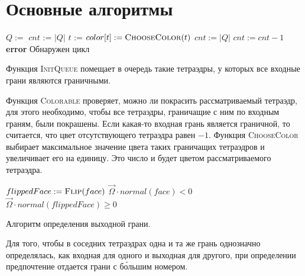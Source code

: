 \chapter{Основные алгоритмы}

\begin{algorithm}[ht!]
\centering
\begin{algorithmic}[1]
\State $Q := $ 
\State $cnt$ := $|Q|$
\State $t$ := 
\State $color[t] := \Call{ChooseColor}{t}$
\State {}
\EndFor
\State $cnt := |Q|$
\Else
\State {}
\State $cnt := cnt - 1$
\EndIf
{}
\State \textbf{error} Обнаружен цикл
\EndIf
\EndWhile
\EndFunction
\end{algorithmic}
\caption{}
\label{alg:1}
\end{algorithm}

Функция \textsc{InitQueue} помещает в очередь такие тетраэдры, у которых все входные грани являются граничными.

Функция \textsc{Colorable} проверяет, можно ли покрасить рассматриваемый тетраэдр, для этого необходимо, чтобы все тетраэдры, граничащие с ним по входным граням, были покрашены. Если какая-то входная грань является граничной, то считается, что цвет отсутствующего тетраэдра равен $-1$. Функция \textsc{ChooseColor} выбирает максимальное значение цвета таких граничащих тетраэдров и увеличивает его на единицу. Это число и будет цветом рассматриваемого тетраэдра. 

\begin{algorithm}[ht!]
\centering
\begin{algorithmic}[1]
\State $flippedFace := \Call{Flip}{face}$
\State \Return $\vec \Omega \cdot normal(face) < 0$
\Else 
\State\Return $\vec \Omega \cdot normal(flippedFace) \geqslant 0$
\EndIf
\EndFunction
\end{algorithmic}
\caption{Алгоритм определения выходной грани.}
\label{alg:2}
\end{algorithm}

Для того, чтобы в соседних тетраэдрах одна и та же грань однозначно определялась, как входная для одного и выходная для другого, при определении предпочтение отдается грани с б\'{о}льшим номером.
